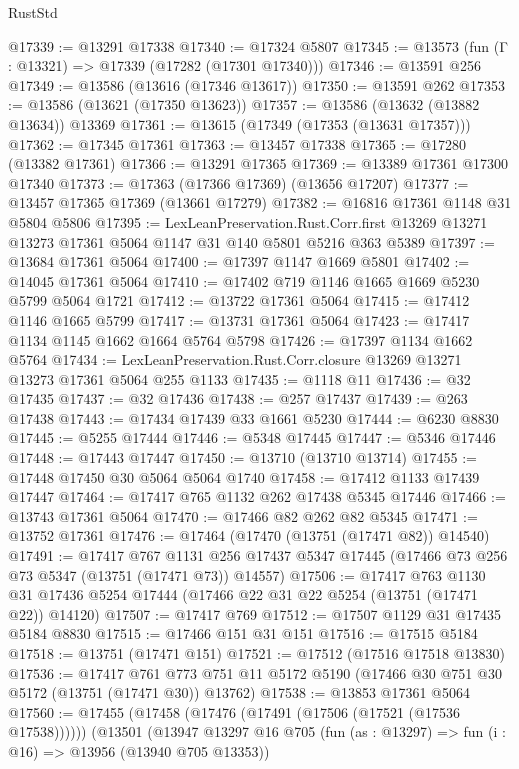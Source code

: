 \begin{lexlean}{RustStd}
\begin{coremodule}
@17339 := @13291 @17338
@17340 := @17324 @5807
@17345 := @13573 (fun (Γ : @13321) => @17339 (@17282 (@17301 @17340)))
@17346 := @13591 @256
@17349 := @13586 (@13616 (@17346 @13617))
@17350 := @13591 @262
@17353 := @13586 (@13621 (@17350 @13623))
@17357 := @13586 (@13632 (@13882 @13634)) @13369
@17361 := @13615 (@17349 (@17353 (@13631 @17357)))
@17362 := @17345 @17361
@17363 := @13457 @17338
@17365 := @17280 (@13382 @17361)
@17366 := @13291 @17365
@17369 := @13389 @17361 @17300 @17340
@17373 := @17363 (@17366 @17369) (@13656 @17207)
@17377 := @13457 @17365 @17369 (@13661 @17279)
@17382 := @16816 @17361 @1148 @31 @5804 @5806
@17395 := LexLeanPreservation.Rust.Corr.first
    @13269
    @13271
    @13273
    @17361
    @5064
    @1147
    @31
    @140
    @5801
    @5216
    @363
    @5389
@17397 := @13684 @17361 @5064
@17400 := @17397 @1147 @1669 @5801
@17402 := @14045 @17361 @5064
@17410 := @17402 @719 @1146 @1665 @1669 @5230 @5799 @5064 @1721
@17412 := @13722 @17361 @5064
@17415 := @17412 @1146 @1665 @5799
@17417 := @13731 @17361 @5064
@17423 := @17417 @1134 @1145 @1662 @1664 @5764 @5798
@17426 := @17397 @1134 @1662 @5764
@17434 := LexLeanPreservation.Rust.Corr.closure @13269 @13271 @13273 @17361 @5064 @255 @1133
@17435 := @1118 @11
@17436 := @32 @17435
@17437 := @32 @17436
@17438 := @257 @17437
@17439 := @263 @17438
@17443 := @17434 @17439 @33 @1661 @5230
@17444 := @6230 @8830
@17445 := @5255 @17444
@17446 := @5348 @17445
@17447 := @5346 @17446
@17448 := @17443 @17447
@17450 := @13710 (@13710 @13714)
@17455 := @17448 @17450 @30 @5064 @5064 @1740
@17458 := @17412 @1133 @17439 @17447
@17464 := @17417 @765 @1132 @262 @17438 @5345 @17446
@17466 := @13743 @17361 @5064
@17470 := @17466 @82 @262 @82 @5345
@17471 := @13752 @17361
@17476 := @17464 (@17470 (@13751 (@17471 @82)) @14540)
@17491 := @17417
    @767
    @1131
    @256
    @17437
    @5347
    @17445
    (@17466 @73 @256 @73 @5347 (@13751 (@17471 @73)) @14557)
@17506 := @17417
    @763
    @1130
    @31
    @17436
    @5254
    @17444
    (@17466 @22 @31 @22 @5254 (@13751 (@17471 @22)) @14120)
@17507 := @17417 @769
@17512 := @17507 @1129 @31 @17435 @5184 @8830
@17515 := @17466 @151 @31 @151
@17516 := @17515 @5184
@17518 := @13751 (@17471 @151)
@17521 := @17512 (@17516 @17518 @13830)
@17536 := @17417
    @761
    @773
    @751
    @11
    @5172
    @5190
    (@17466 @30 @751 @30 @5172 (@13751 (@17471 @30)) @13762)
@17538 := @13853 @17361 @5064
@17560 := @17455
    (@17458 (@17476 (@17491 (@17506 (@17521 (@17536 @17538))))))
    (@13501
      (@13947
        @13297
        @16
        @705
        (fun (as : @13297) => fun (i : @16) => @13956 (@13940 @705 @13353))

\end{coremodule}
\end{lexlean}
